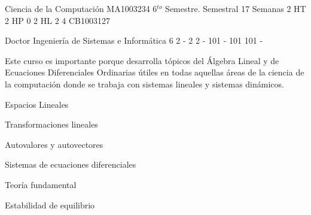 \documentclass[a4paper,8pt]{article}
\begin{document}
\setNombreProfesor{}
\setGradoProfesorAbreviado{}
\sylabusHeader

\academicaTable
{Ciencia de la Computación} %
{MA1003234} %
{6$^{to}$ Semestre.} %
{Semestral} %
{17 Semanas} %
{2 HT} %
{2 HP} %
{0} %
{2 HL}  %
{2} %
{4} %
{CB1003127} %

\administrativaTable
{Doctor} %
{Ingeniería de Sistemas e Informática} %
{6} %
{2} %
{-} %
{2} %
{2} %
{-} %
{101} %
{-} %
{101} %
{101} %
{-} %


\begin{fundamentacion}
Este curso es importante porque desarrolla tópicos del Álgebra Lineal y de Ecuaciones Diferenciales Ordinarias útiles en todas aquellas áreas de la ciencia de la computación donde se trabaja con sistemas lineales y sistemas dinámicos.

\end{fundamentacion}

\begin{sumilla}
\item Espacios Lineales
\item Transformaciones lineales
\item Autovalores y autovectores
\item Sistemas de ecuaciones diferenciales
\item Teoría fundamental
\item Estabilidad de equilibrio

\end{sumilla}

\begin{competenciasAsignatura}
\item {}
\item {}
\item {}

\end{competenciasAsignatura}
\end{document}
